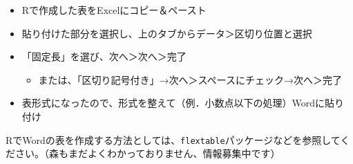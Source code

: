 \documentclass[]{book}
\providecommand{\tightlist}{%
  \setlength{\itemsep}{0pt}\setlength{\parskip}{0pt}}
\begin{document}
\begin{itemize}
\tightlist
\item
  Rで作成した表をExcelにコピー＆ペースト
\item
  貼り付けた部分を選択し、上のタブからデータ＞区切り位置と選択
\item
  「固定長」を選び、次へ＞次へ＞完了

  \begin{itemize}
  \tightlist
  \item
    または、「区切り記号付き」→次へ＞スペースにチェック→次へ＞完了
  \end{itemize}
\item
  表形式になったので、形式を整えて（例．小数点以下の処理）Wordに貼り付け
\end{itemize}

RでWordの表を作成する方法としては、\texttt{flextable}パッケージなどを参照してください。（森もまだよくわかっておりません、情報募集中です）


\end{document}
